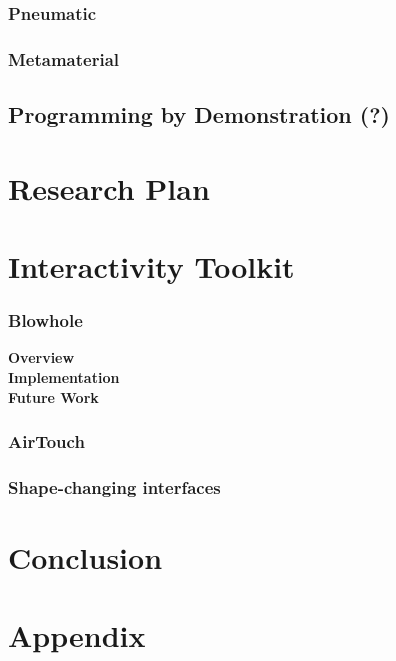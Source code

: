       \subsubsection{Pneumatic}
      \subsubsection{Metamaterial}
    \subsection{Programming by Demonstration (?)}
          
  \section{Research Plan}
  	\section{Interactivity Toolkit}
  	\subsubsection{Blowhole}
  	  \textbf{Overview}\\
  	  \textbf{Implementation}\\  	  
  	  \textbf{Future Work}
  	\subsubsection{AirTouch}
  	\subsubsection{Shape-changing interfaces}

          
  \section{Conclusion}
            
  \section{Appendix}

  
  

